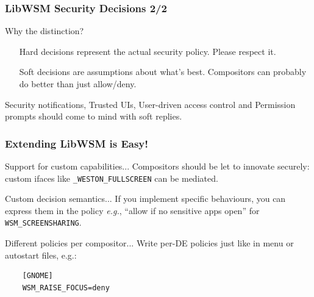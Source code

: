 \begin{frame}
\frametitle{LibWSM Security Decisions 2/2}

	\begin{block}{Why the distinction?}
	\begin{enumerate}[leftmargin=1em]
	\item[Hard decisions] represent the actual security policy. Please respect it.
	\item[Soft decisions] are assumptions about what's best. Compositors can probably do better than just allow/deny.
	\end{enumerate}
	\end{block}
	
	Security notifications, Trusted UIs, User-driven access control and Permission prompts should come to mind with soft replies.

\end{frame}

\begin{frame}[fragile]
\frametitle{Extending LibWSM is Easy!}
	
	\begin{block}{Support for custom capabilities...}
	Compositors should be let to innovate securely: custom ifaces like \texttt{\_WESTON\_FULLSCREEN} can be mediated.
	\end{block}
	
	\begin{block}{Custom decision semantics...}
	If you implement specific behaviours, you can express them in the policy \textit{e.g.},
	``allow if no sensitive apps open'' for \texttt{WSM\_SCREENSHARING}.
	\end{block}

	\begin{block}{Different policies per compositor...}
	Write per-DE policies just like in menu or autostart files, e.g.:
	\begin{verbatim}
	[GNOME]
	WSM_RAISE_FOCUS=deny
	\end{verbatim}
	\end{block}
	
\end{frame}

